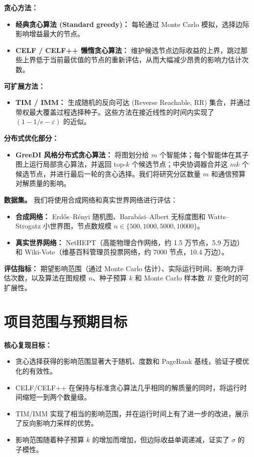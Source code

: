\documentclass[UTF8, 10pt]{ctexart}
\begin{document}
\textbf{贪心方法：}
\begin{itemize}
    \item \textbf{经典贪心算法 (Standard greedy)：} 每轮通过 Monte Carlo 模拟，选择边际影响增益最大的节点。
    \item \textbf{CELF / CELF++ 懒惰贪心算法：} 维护候选节点边际收益的上界，跳过那些上界低于当前最优值的节点的重新评估，从而大幅减少昂贵的影响力估计次数。
\end{itemize}

\textbf{可扩展方法：}
\begin{itemize}
    \item \textbf{TIM / IMM：} 生成随机的反向可达 (Reverse Reachable, RR) 集合，并通过带权最大覆盖过程选择种子。这些方法在接近线性的时间内实现了 $(1-1/e-\varepsilon)$ 的近似。
\end{itemize}

\textbf{分布式优化部分：}
\begin{itemize}
    \item \textbf{GreeDI 风格分布式贪心算法：} 将图划分给 $m$ 个智能体；每个智能体在其子图上运行局部贪心算法，并返回 top-$k$ 个候选节点；中央协调器合并这 $mk$ 个候选节点，并进行最后一轮的贪心选择。我们将研究分区数量 $m$ 和通信预算对解质量的影响。
\end{itemize}

\textbf{数据集。}
我们将使用合成网络和真实世界网络进行评估：
\begin{itemize}
    \item \textbf{合成网络：} Erd\H{o}s--R\'enyi 随机图、Barab\'asi--Albert 无标度图和 Watts--Strogatz 小世界图，节点数规模 $n \in \{500, 1000, 5000, 10000\}$。
    \item \textbf{真实世界网络：} NetHEPT（高能物理合作网络，约 1.5 万节点，5.9 万边）和 Wiki-Vote（维基百科管理员投票网络，约 7000 节点，10.4 万边）。
\end{itemize}

\textbf{评估指标：}
期望影响范围（通过 Monte Carlo 估计）、实际运行时间、影响力评估次数，以及算法在图规模 $n$、种子预算 $k$ 和 Monte Carlo 样本数 $R$ 变化时的可扩展性。

\section{项目范围与预期目标}

\textbf{核心复现目标：}
\begin{itemize}
    \item 贪心选择获得的影响范围显著大于随机、度数和 PageRank 基线，验证子模优化的有效性。
    \item CELF/CELF++ 在保持与标准贪心算法几乎相同的解质量的同时，将运行时间缩短一到两个数量级。
    \item TIM/IMM 实现了相当的影响范围，并在运行时间上有了进一步的改进，展示了反向影响力采样的优势。
    \item 影响范围随着种子预算 $k$ 的增加而增加，但边际收益单调递减，证实了 $\sigma$ 的子模性。
\end{itemize}
\end{document}
